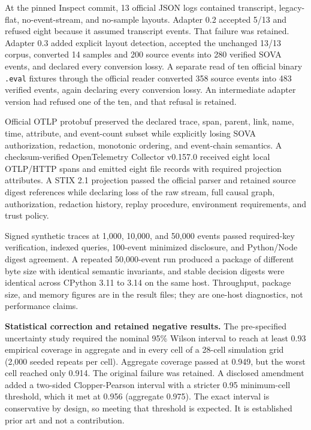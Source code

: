 \documentclass[
  american,
  10pt,
  a4paper,
]{article}
\begin{document}
At the pinned Inspect commit, 13 official JSON logs contained
transcript, legacy-flat, no-event-stream, and no-sample layouts. Adapter
0.2 accepted 5/13 and refused eight because it assumed transcript
events. That failure was retained. Adapter 0.3 added explicit layout
detection, accepted the unchanged 13/13 corpus, converted 14 samples and
200 source events into 280 verified SOVA events, and declared every
conversion lossy. A separate read of ten official binary \texttt{.eval}
fixtures through the official reader converted 358 source events into
483 verified events, again declaring every conversion lossy. An
intermediate adapter version had refused one of the ten, and that
refusal is retained.

Official OTLP protobuf preserved the declared trace, span, parent, link,
name, time, attribute, and event-count subset while explicitly losing
SOVA authorization, redaction, monotonic ordering, and event-chain
semantics. A checksum-verified OpenTelemetry Collector v0.157.0 received
eight local OTLP/HTTP spans and emitted eight file records with required
projection attributes. A STIX 2.1 projection passed the official parser
and retained source digest references while declaring loss of the raw
stream, full causal graph, authorization, redaction history, replay
procedure, environment requirements, and trust policy.

Signed synthetic traces at 1,000, 10,000, and 50,000 events passed
required-key verification, indexed queries, 100-event minimized
disclosure, and Python/Node digest agreement. A repeated 50,000-event
run produced a package of different byte size with identical semantic
invariants, and stable decision digests were identical across CPython
3.11 to 3.14 on the same host. Throughput, package size, and memory
figures are in the result files; they are one-host diagnostics, not
performance claims.

\textbf{Statistical correction and retained negative results.} The
pre-specified uncertainty study required the nominal 95\% Wilson
interval to reach at least 0.93 empirical coverage in aggregate and in
every cell of a 28-cell simulation grid (2,000 seeded repeats per cell).
Aggregate coverage passed at 0.949, but the worst cell reached only
0.914. The original failure was retained. A disclosed amendment added a
two-sided Clopper-Pearson interval with a stricter 0.95 minimum-cell
threshold, which it met at 0.956 (aggregate 0.975). The exact interval
is conservative by design, so meeting that threshold is expected. It is
established prior art and not a contribution.
\end{document}
